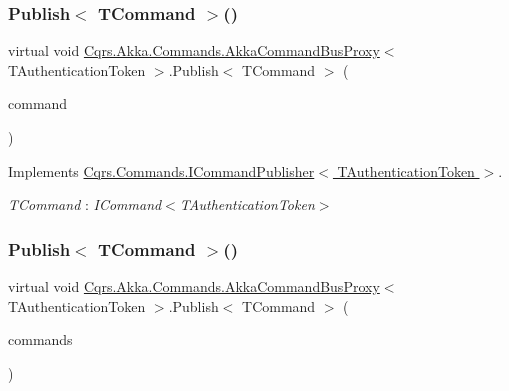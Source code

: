 \subsubsection{\texorpdfstring{Publish$<$ T\+Command $>$()}{Publish< TCommand >()}\hspace{0.1cm}{\footnotesize\ttfamily [1/2]}}
{\footnotesize\ttfamily virtual void \hyperlink{classCqrs_1_1Akka_1_1Commands_1_1AkkaCommandBusProxy}{Cqrs.\+Akka.\+Commands.\+Akka\+Command\+Bus\+Proxy}$<$ T\+Authentication\+Token $>$.Publish$<$ T\+Command $>$ (\begin{DoxyParamCaption}\item[{T\+Command}]{command }\end{DoxyParamCaption})\hspace{0.3cm}{\ttfamily [virtual]}}



Implements \hyperlink{interfaceCqrs_1_1Commands_1_1ICommandPublisher_aeeb487ad5686d9c44d214b1daaf7833a}{Cqrs.\+Commands.\+I\+Command\+Publisher$<$ T\+Authentication\+Token $>$}.

\begin{Desc}
\item[Type Constraints]\begin{description}
\item[{\em T\+Command} : {\em I\+Command$<$T\+Authentication\+Token$>$}]\end{description}
\end{Desc}
\mbox{\label{classCqrs_1_1Akka_1_1Commands_1_1AkkaCommandBusProxy_a81dc8162ca933d84b6aee04aff589010}} 
\subsubsection{\texorpdfstring{Publish$<$ T\+Command $>$()}{Publish< TCommand >()}\hspace{0.1cm}{\footnotesize\ttfamily [2/2]}}
{\footnotesize\ttfamily virtual void \hyperlink{classCqrs_1_1Akka_1_1Commands_1_1AkkaCommandBusProxy}{Cqrs.\+Akka.\+Commands.\+Akka\+Command\+Bus\+Proxy}$<$ T\+Authentication\+Token $>$.Publish$<$ T\+Command $>$ (\begin{DoxyParamCaption}\item[{I\+Enumerable$<$ T\+Command $>$}]{commands }\end{DoxyParamCaption})\hspace{0.3cm}{\ttfamily [virtual]}}



